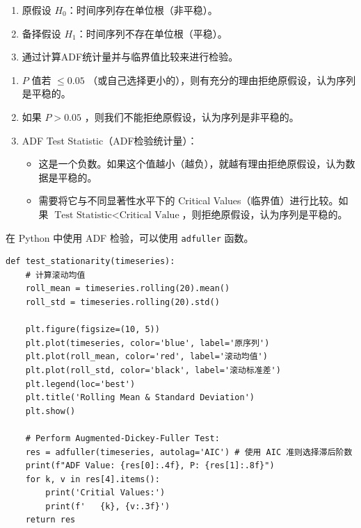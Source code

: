 \begin{theorem}[ADF 检验]
    \begin{enumerate}
        \item 原假设 $H_0$：时间序列存在单位根（非平稳）。
        \item 备择假设 $H_1$：时间序列不存在单位根（平稳）。
        \item 通过计算ADF统计量并与临界值比较来进行检验。
    \end{enumerate}

    \begin{tips}
        \begin{enumerate}
            \item $P$ 值若 $ \leq 0.05$ （或自己选择更小的），则有充分的理由拒绝原假设，认为序列是平稳的。
            \item 如果 $P > 0.05$ ，则我们不能拒绝原假设，认为序列是非平稳的。
            \item ADF Test Statistic（ADF检验统计量）：
                  \begin{itemize}
                      \item 这是一个负数。如果这个值越小（越负），就越有理由拒绝原假设，认为数据是平稳的。
                      \item 需要将它与不同显著性水平下的 Critical Values（临界值）进行比较。如果 $\text{Test Statistic} < \text{Critical Value}$，则拒绝原假设，认为序列是平稳的。
                  \end{itemize}
        \end{enumerate}
    \end{tips}
\end{theorem}

在 Python 中使用 ADF 检验，可以使用 \verb`adfuller` 函数。

\begin{lstlisting}[style=python]
def test_stationarity(timeseries):
    # 计算滚动均值
    roll_mean = timeseries.rolling(20).mean()
    roll_std = timeseries.rolling(20).std()

    plt.figure(figsize=(10, 5))
    plt.plot(timeseries, color='blue', label='原序列')
    plt.plot(roll_mean, color='red', label='滚动均值')
    plt.plot(roll_std, color='black', label='滚动标准差')
    plt.legend(loc='best')
    plt.title('Rolling Mean & Standard Deviation')
    plt.show()

    # Perform Augmented-Dickey-Fuller Test:
    res = adfuller(timeseries, autolag='AIC') # 使用 AIC 准则选择滞后阶数
    print(f"ADF Value: {res[0]:.4f}, P: {res[1]:.8f}")
    for k, v in res[4].items():
        print('Critial Values:')
        print(f'   {k}, {v:.3f}')
    return res
\end{lstlisting}

